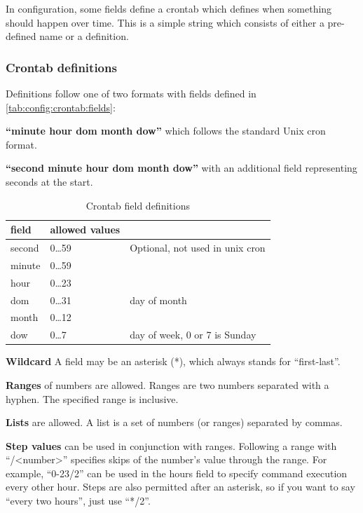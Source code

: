 \label{config:crontab}

In configuration, some fields define a crontab which defines when something should happen over time.
This is a simple string which consists of either a pre-defined name or a definition.

\subsubsection{Crontab definitions}
Definitions follow one of two formats with fields defined in \vref{tab:config:crontab:fields}:

\textbf{``minute hour dom month dow''} which follows the standard Unix cron format.

\textbf{``second minute hour dom month dow''} with an additional field representing seconds at the start.

\begin{table}[ht]
 \caption{Crontab field definitions}
 \begin{tabular}{l l l}
 \toprule
 field & allowed values \\
 \midrule
 second & 0\dots59 & Optional, not used in unix cron\\
 minute & 0\dots59 \\
 hour & 0\dots23 \\
 dom & 0\dots31 & day of month \\
 month & 0\dots12 \\
 dow & 0\dots7 & day of week, 0 or 7 is Sunday\\
 \bottomrule
 \end{tabular}
\end{table}

\textbf{Wildcard} A field may be an asterisk (*), which always stands for ``first-last''.

\textbf{Ranges} of numbers are allowed.
Ranges are two numbers separated with a hyphen.
The specified range is inclusive.

\textbf{Lists} are allowed.
A list is a set of numbers (or ranges) separated by commas.

\textbf{Step values} can be used in conjunction with ranges.
Following a range with ``/<number>'' specifies skips of the number's value through the range.
For example, ``0-23/2'' can be used in the hours field to specify command execution every other hour.
Steps are also permitted after an asterisk, so if you want to say ``every two hours'', just use ``*/2''.

